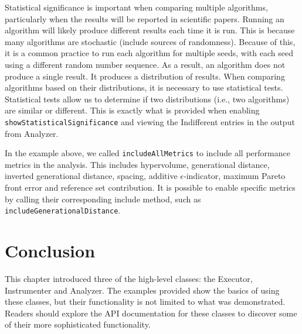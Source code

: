Statistical significance is important when comparing multiple algorithms, particularly when the results will be reported in scientific papers.  Running an algorithm will likely produce different results each time it is run.  This is because many algorithms are stochastic (include sources of randomness).  Because of this, it is a common practice to run each algorithm for multiple seeds, with each seed using a different random number sequence.  As a result, an algorithm does not produce a single result.  It produces a distribution of results.  When comparing algorithms based on their distributions, it is necessary to use statistical tests.  Statistical tests allow us to determine if two distributions (i.e., two algorithms) are similar or different.  This is exactly what is provided when enabling \texttt{showStatisticalSignificance} and viewing the Indifferent entries in the output from Analyzer.

In the example above, we called \texttt{includeAllMetrics} to include all performance metrics in the analysis.  This includes hypervolume, generational distance, inverted generational distance, spacing, additive $\epsilon$-indicator, maximum Pareto front error and reference set contribution.  It is possible to enable specific metrics by calling their corresponding include method, such as \texttt{includeGenerationalDistance}.

\section{Conclusion}
This chapter introduced three of the high-level classes: the Executor, Instrumenter and Analyzer.  The examples provided show the basics of using these classes, but their functionality is not limited to what was demonstrated.  Readers should explore the API documentation for these classes to discover some of their more sophisticated functionality.